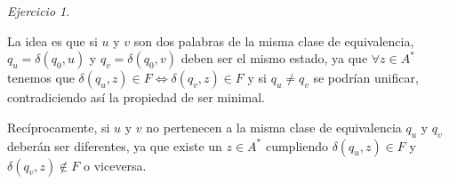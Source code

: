\documentclass[12pt,spanish]{article}
\theoremstyle{definition}
\theoremstyle{remark}
\newtheorem{exercise}{Ejercicio}%
\begin{document}
\begin{exercise}
\begin{enumerate}[a)]
    La idea es que si $u$ y $v$ son dos palabras de la misma clase de
    equivalencia, $q_u=\delta(q_0,u)$ y $q_v=\delta(q_0,v)$ deben ser
    el mismo estado, ya que $\forall z \in A^*$ tenemos que
    $\delta(q_u,z) \in F \Leftrightarrow \delta(q_v,z) \in F$ y si
    $q_u \neq q_v$ se podrían unificar, contradiciendo así la
    propiedad de ser minimal.

    Recíprocamente, si $u$ y $v$ no pertenecen a la misma clase de
    equivalencia $q_u$ y $q_v$ deberán ser diferentes, ya que existe
    un $z\in A^*$ cumpliendo $\delta(q_u,z) \in F$ y
    $\delta(q_v,z) \notin F$ o viceversa.
  \end{enumerate}
  
\end{exercise}
\end{document}
